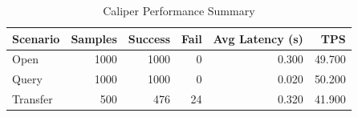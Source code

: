 \begin{table}
\caption{Caliper Performance Summary}
\label{tab:caliper_round}
\begin{tabular}{lrrrrr}
\toprule
Scenario & Samples & Success & Fail & Avg Latency (s) & TPS \\
\midrule
Open & 1000 & 1000 & 0 & 0.300 & 49.700 \\
Query & 1000 & 1000 & 0 & 0.020 & 50.200 \\
Transfer & 500 & 476 & 24 & 0.320 & 41.900 \\
\bottomrule
\end{tabular}
\end{table}
